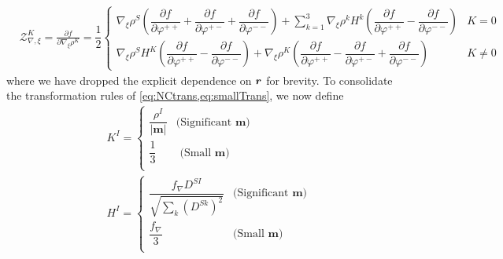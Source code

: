 \begin{subequations}
\label{eq:ZvarphiVar}
\begin{align}
&\mathcal{Z}^K_{\nabla,\xi} = \frac{\partial f}{\partial \nabla_\xi \rho^K} = \dfrac{1}{2} \begin{cases}
                                                          \nabla_\xi\rho^S    \left(  \dfrac{\partial f}{\partial \varphi^{++}} + \dfrac{\partial f}{\partial \varphi^{+-}} + \dfrac{\partial f}{\partial \varphi^{--}} \right)  
                                                          + \sum_{k=1}^3 \nabla_\xi \rho^k H^k 
                                                          \left( \dfrac{\partial f}{\partial \varphi^{++}} - \dfrac{\partial f}{\partial \varphi^{--}} 
                                                          \right)                                                          
                                                          & K= 0 \\[8pt]                                                                                                        
                                                          \nabla_\xi\rho^S H^K  \left( \dfrac{\partial f}{\partial \varphi^{++}} - \dfrac{\partial f}{\partial \varphi^{--}} \right) 
                                                          + \nabla_\xi\rho^K
                                                          \left(\dfrac{\partial f}{\partial \varphi^{++}} - \dfrac{\partial f}{\partial \varphi^{+-}} + \dfrac{\partial f}{\partial \varphi^{--}}
                                                           \right)
                                                          & K \neq 0
                                                        \end{cases}                                                                                                                                     
\end{align}
\end{subequations}
where we have dropped the explicit dependence on $\boldsymbol{r}$ for brevity. To consolidate the transformation rules of 
\cref{eq:NCtrans,eq:smallTrans}, we now define
\begin{subequations}
\begin{align}
&K^I = 
\begin{cases}
  \dfrac{\rho^I}{\vert \mathbf{m} \vert} & \text{(Significant }\mathbf{m}\text{)} \\[20pt]
  \dfrac{1}{3} & \text{ (Small }\mathbf{m}\text{)} \\[12pt]
\end{cases}\\
&H^I = 
\begin{cases}
  \dfrac{f_\nabla D^{SI} }{\sqrt{\sum_k \left(D^{Sk}\right)^2   }} & \text{(Significant }\mathbf{m}\text{)} \\[20pt]
  \dfrac{f_\nabla}{3} & \text{(Small }\mathbf{m}\text{)} \\[12pt]
\end{cases}
\end{align}
\end{subequations}


